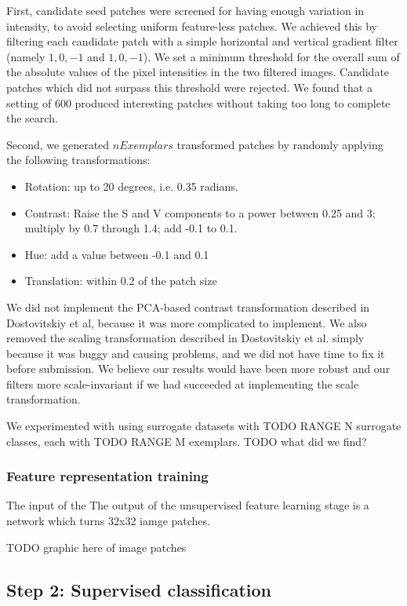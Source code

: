 \documentclass{article}
\begin{document}
First, candidate seed patches were screened for having enough variation in intensity, to avoid selecting uniform feature-less patches. We achieved this by filtering each candidate patch with a simple horizontal and vertical gradient filter (namely ${{1, 0, -1}}$ and ${{1},{0},{-1}}$). We set a minimum threshold for the overall sum of the absolute values of the pixel intensities in the two filtered images. Candidate patches which did not surpass this threshold were rejected. We found that a setting of $600$ produced interesting patches without taking too long to complete the search.

Second, we generated $nExemplars$ transformed patches by randomly applying the following transformations:

\begin{itemize}
\item Rotation: up to 20 degrees, i.e. 0.35 radians.
\item Contrast: Raise the S and V components to a power between 0.25 and 3; multiply by 0.7 through 1.4; add -0.1 to 0.1.
\item Hue: add a value between -0.1 and 0.1
\item Translation: within 0.2 of the patch size
\end{itemize}

We did not implement the PCA-based contrast transformation described in Dostovitskiy et al, because it was more complicated to implement. We also removed the scaling transformation described in Dostovitskiy et al. simply because it was buggy and causing problems, and we did not have time to fix it before submission. We believe our results would have been more robust and our filters more scale-invariant if we had succeeded at implementing the scale transformation.

We experimented with using surrogate datasets with TODO RANGE N surrogate classes, each with TODO RANGE M exemplars. TODO what did we find?

\subsubsection*{Feature representation training}
The input of the The output of the unsupervised feature learning stage is a network which turns 32x32 iamge patches.

TODO graphic here of image patches

\subsection*{Step 2: Supervised classification}
\end{document}
